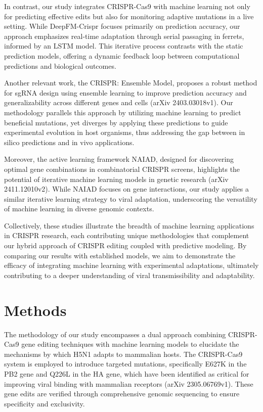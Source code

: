 \documentclass{article}
\begin{document}
In contrast, our study integrates CRISPR-Cas9 with machine learning not only for predicting effective edits but also for monitoring adaptive mutations in a live setting. While DeepFM-Crispr focuses primarily on prediction accuracy, our approach emphasizes real-time adaptation through serial passaging in ferrets, informed by an LSTM model. This iterative process contrasts with the static prediction models, offering a dynamic feedback loop between computational predictions and biological outcomes.

Another relevant work, the CRISPR: Ensemble Model, proposes a robust method for sgRNA design using ensemble learning to improve prediction accuracy and generalizability across different genes and cells (arXiv 2403.03018v1). Our methodology parallels this approach by utilizing machine learning to predict beneficial mutations, yet diverges by applying these predictions to guide experimental evolution in host organisms, thus addressing the gap between in silico predictions and in vivo applications.

Moreover, the active learning framework NAIAD, designed for discovering optimal gene combinations in combinatorial CRISPR screens, highlights the potential of iterative machine learning models in genetic research (arXiv 2411.12010v2). While NAIAD focuses on gene interactions, our study applies a similar iterative learning strategy to viral adaptation, underscoring the versatility of machine learning in diverse genomic contexts.

Collectively, these studies illustrate the breadth of machine learning applications in CRISPR research, each contributing unique methodologies that complement our hybrid approach of CRISPR editing coupled with predictive modeling. By comparing our results with established models, we aim to demonstrate the efficacy of integrating machine learning with experimental adaptations, ultimately contributing to a deeper understanding of viral transmissibility and adaptability.

\section{Methods}
The methodology of our study encompasses a dual approach combining CRISPR-Cas9 gene editing techniques with machine learning models to elucidate the mechanisms by which H5N1 adapts to mammalian hosts. The CRISPR-Cas9 system is employed to introduce targeted mutations, specifically E627K in the PB2 gene and Q226L in the HA gene, which have been identified as critical for improving viral binding with mammalian receptors (arXiv 2305.06769v1). These gene edits are verified through comprehensive genomic sequencing to ensure specificity and exclusivity.
\end{document}
